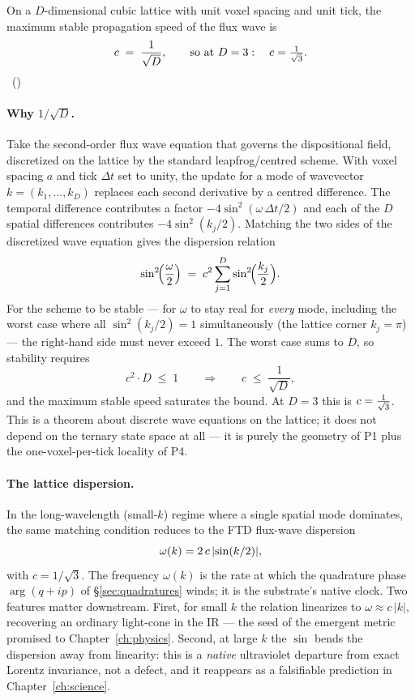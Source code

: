 \begin{result}\label{res:cfl}
On a $D$-dimensional cubic lattice with unit voxel spacing and unit tick, the
maximum stable propagation speed of the flux wave is
\[
  c \;=\; \frac{1}{\sqrt D},
  \qquad\text{so at } D=3:\quad c=\tfrac{1}{\sqrt 3} .
\]
~()
\end{result}

\paragraph{Why $1/\sqrt D$.} Take the second-order flux wave equation that governs
the dispositional field, discretized on the lattice by the standard
leapfrog/centred scheme. With voxel spacing $a$ and tick $\Delta t$ set to unity,
the update for a mode of wavevector $k=(k_1,\dots,k_D)$ replaces each second
derivative by a centred difference. The temporal difference contributes a factor
$-4\sin^2(\omega\,\Delta t/2)$ and each of the $D$ spatial differences contributes
$-4\sin^2(k_j/2)$. Matching the two sides of the discretized wave equation gives
the dispersion relation
\[
  \sin^2\!\Bigl(\frac{\omega}{2}\Bigr)
  \;=\; c^2 \sum_{j=1}^{D} \sin^2\!\Bigl(\frac{k_j}{2}\Bigr).
\]
For the scheme to be stable --- for $\omega$ to stay real for \emph{every} mode,
including the worst case where all $\sin^2(k_j/2)=1$ simultaneously (the lattice
corner $k_j=\pi$) --- the right-hand side must never exceed $1$. The worst case
sums to $D$, so stability requires
\[
  c^2 \cdot D \;\le\; 1
  \qquad\Longrightarrow\qquad
  c \;\le\; \frac{1}{\sqrt D},
\]
and the maximum stable speed saturates the bound. At $D=3$ this is $c=\tfrac{1}{\sqrt 3}$. This
is a theorem about discrete wave equations on the lattice; it does not depend on
the ternary state space at all --- it is purely the geometry of P1 plus the
one-voxel-per-tick locality of P4.

\paragraph{The lattice dispersion.} In the long-wavelength (small-$k$) regime where
a single spatial mode dominates, the same matching condition reduces to the FTD
flux-wave dispersion
\[
  \omega(k)=2\,c\,\lvert\sin(k/2)\rvert ,
\]
with $c=1/\sqrt3$. The frequency $\omega(k)$ is the rate at which the quadrature
phase $\arg(q+ip)$ of \S\ref{sec:quadratures} winds; it is the substrate's native
clock. Two features matter downstream. First, for small $k$ the relation linearizes
to $\omega \approx c\,\lvert k\rvert$, recovering an ordinary light-cone in the IR
--- the seed of the emergent metric promised to Chapter~\ref{ch:physics}. Second,
at large $k$ the $\sin$ bends the dispersion away from linearity: this is a
\emph{native} ultraviolet departure from exact Lorentz invariance, not a defect,
and it reappears as a falsifiable prediction in Chapter~\ref{ch:science}.

